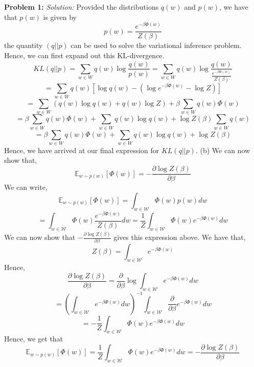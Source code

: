 \documentclass[12pt]{article}
\begin{document}
\maketitle


\textbf{Problem 1:}  \newline 
\emph{Solution:} \newline \newline 
Provided the distributions $q(w)$ and $p(w)$, we have that $p(w)$ is given by 
$$ p(w) = \frac{e^{-\beta \Phi (w)  } }{Z (\beta)  }  $$
the quantity $(q || p) $ can be used to solve the variational inference problem. Hence, we can first expand out this KL-divergence.  
$$ KL(q || p) =\sum_{w \in W} q(w) \log \frac{q(w)}{ p(w)}   =  \sum_{w \in W} q(w) \log \frac{q(w)}{ \frac{e^{-\beta \Phi (w)  } }{Z (\beta)  }   }   $$
$$ =  \sum_{w \in W} q(w)  [  \log  q(w)  -   (\log e^{-\beta \Phi (w)  }  - \log Z )     ]    $$
$$ =  \sum_{w \in W}   (q(w)   \log  q(w)   +    q(w) \log Z)    + \beta   \sum_{w \in W}   q(w)  \Phi (w) $$
$$  = \beta   \sum_{w \in W}   q(w)  \Phi (w)   +   \sum_{w \in W}   q(w)  \log q(w)  + \log Z (\beta)\sum_{w \in W} q(w)     $$
$$  = \beta   \sum_{w \in W}   q(w)  \Phi (w)   +   \sum_{w \in W}   q(w)  \log q(w)  + \log Z (\beta)   $$
Hence, we have arrived at our final expression for $ KL(q || p) $. \newline \newline 
(b) We can now show that, 
$$\mathbb{E}_{w \sim p(w) }  [\Phi (w)  ]  = - \frac{\partial \log Z(\beta )  }{ \partial \beta } $$
We can write, 
$$\mathbb{E}_{w \sim p(w) }  [\Phi (w)  ]  = \int_{w \in \mathcal{W} } \Phi (w)   p(w)  dw    $$ 
$$ =   \int_{w \in \mathcal{W} } \Phi (w)    \frac{e^{-\beta \Phi (w)  } }{Z (\beta)  }   dw   = \frac{1}{Z} \int_{w \in \mathcal{W} } \Phi (w) e^{-\beta \Phi (w)  }   dw    $$
We can now show that $ - \frac{\partial \log Z(\beta )  }{ \partial \beta } $ gives this expression above. We have that, 
$$ Z (\beta )  =  \int_{w \in \mathcal{W} } e^{-\beta \Phi (w)  }   $$
Hence,
$$  \frac{\partial \log Z(\beta )  }{ \partial \beta }  =  \frac{\partial   }{ \partial \beta }  \log    \int_{w \in \mathcal{W} } e^{-\beta \Phi (w)  } dw $$
$$ =  ( \int_{w \in \mathcal{W} } e^{-\beta \Phi (w)  } dw  )^{-1}  \int_{w \in \mathcal{W} }  \frac{\partial   }{ \partial \beta } e^{-\beta \Phi (w)  } dw  $$
$$ = -  \frac{1}{Z} \int_{w \in \mathcal{W} }  \Phi (w) e^{-\beta \Phi (w)  } dw   $$
Hence, we get that  
$$ \mathbb{E}_{w \sim p(w) }  [\Phi (w)  ]   = \frac{1}{Z} \int_{w \in \mathcal{W} }  \Phi (w) e^{-\beta \Phi (w)  } dw  = - \frac{\partial \log Z(\beta )  }{ \partial \beta }    $$
\end{document}
